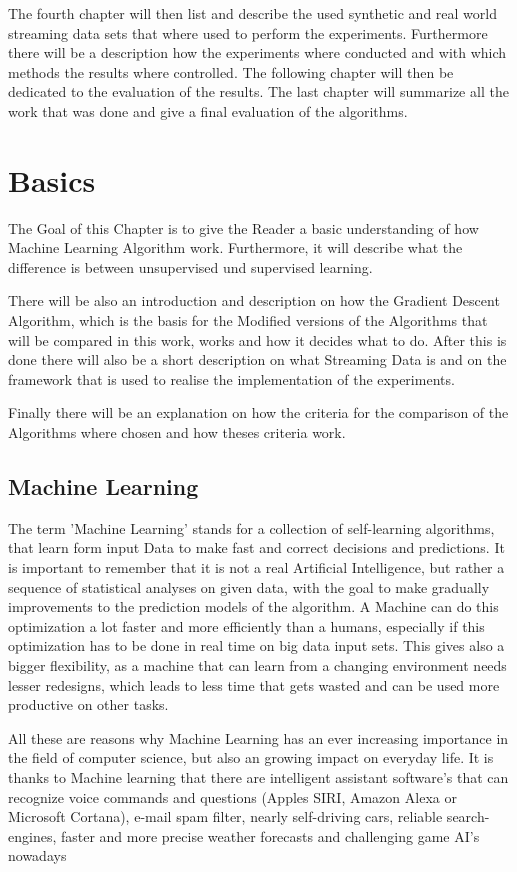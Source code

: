 \documentclass[12pt,oneside,a4paper,parskip]{scrbook}
\begin{document}
The fourth chapter will then list and describe the used synthetic and real world streaming data sets that where used to 
perform the experiments.
Furthermore there will be a description how the experiments where conducted and with which methods the results where controlled.
The following chapter will then be dedicated to the evaluation of the results. 
The last chapter will summarize all the work that was done and give a final evaluation of the algorithms.

\chapter{Basics}
The Goal of this Chapter is to give the Reader a basic understanding of how Machine Learning Algorithm work. 
Furthermore, it will describe what the difference is between unsupervised und supervised learning. 

There will be also an introduction and description on how the Gradient Descent Algorithm, which is the basis for the 
Modified versions of the Algorithms that will be compared in this work, works and how it decides what to do. 
After this is done there will also be a short description on what Streaming Data is and on the framework that is used to 
realise the implementation of the experiments.

Finally there will be an explanation on how the criteria for the comparison of the Algorithms where chosen and how 
theses criteria work.

\section{Machine Learning}

The term 'Machine Learning' stands for a collection of self-learning algorithms, that learn form input Data to make 
fast and correct decisions and predictions. It is important to remember that it is not a real Artificial Intelligence, 
but rather a sequence of statistical analyses on given data, with the goal to make gradually improvements to the prediction 
models of the algorithm.  
A Machine can do this optimization a lot faster and more efficiently than a humans, especially if this optimization has to be 
done in real time on big data input sets. This gives also a bigger flexibility, as a machine that can learn from a changing 
environment needs lesser redesigns, which leads to less time that gets wasted and can be used more productive on other 
tasks. 

All these are reasons why Machine Learning has an ever increasing importance in the field of computer science, 
but also an growing impact on everyday life. It is thanks to Machine learning that there are intelligent assistant 
software's that can recognize voice commands and questions (Apples SIRI, Amazon Alexa or Microsoft Cortana),
e-mail spam filter, nearly self-driving cars, reliable search-engines, faster and more precise weather forecasts and 
challenging game AI's nowadays 
\end{document}
